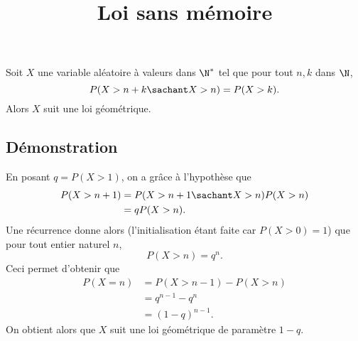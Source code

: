 \documentclass[fontsize=12pt,twoside=false,parskip=half]{scrartcl}
\title{Loi sans mémoire}
\date{}
\author{}
\begin{document}
\maketitle
   \begin{Theoreme}
      Soit $X$ une variable aléatoire à valeurs dans $\N^*$ tel que pour 
      tout $n, k$ dans $\N$,
      \[
         P(X > n + k \sachant X > n) = P(X > k).
      \]
      Alors $X$ suit une loi géométrique.
   \end{Theoreme}
   \subsection{Démonstration}
      En posant $q = P(X > 1)$, on a grâce à l’hypothèse que
      \begin{align*}
         P(X > n + 1) &= P(X > n + 1 \sachant X > n)P(X > n)\\ 
                      &= qP(X > n).
      \end{align*}
      Une récurrence donne alors (l’initialisation étant faite car 
      $P(X > 0) = 1$) que pour tout entier naturel $n$,
      \[
         P(X > n) = q^n.
      \]
      Ceci permet d’obtenir que
      \begin{align*}
         P(X = n) &= P(X > n - 1) - P(X > n)\\ 
                  &= q^{n -1} - q^n\\
                  &= (1 - q)^{n - 1}.
      \end{align*}
      On obtient alors que $X$ suit une loi géométrique de paramètre $1 - q$.
\end{document}
